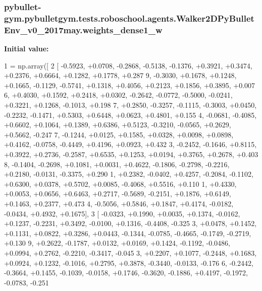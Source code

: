 \subsubsection[{\texorpdfstring{weights\+\_\+dense1\+\_\+w}{weights_dense1_w}}]{\setlength{\rightskip}{0pt plus 5cm}pybullet-\/gym.\+pybulletgym.\+tests.\+roboschool.\+agents.\+Walker2\+D\+Py\+Bullet\+Env\+\_\+v0\+\_\+2017may.\+weights\+\_\+dense1\+\_\+w}\hypertarget{namespacepybullet-gym_1_1pybulletgym_1_1tests_1_1roboschool_1_1agents_1_1_walker2_d_py_bullet_env__v0__2017may_a1ea4f2a96239d2b99fbcdc5fc68877ac}{}\label{namespacepybullet-gym_1_1pybulletgym_1_1tests_1_1roboschool_1_1agents_1_1_walker2_d_py_bullet_env__v0__2017may_a1ea4f2a96239d2b99fbcdc5fc68877ac}
{\bfseries Initial value\+:}
\begin{DoxyCode}
1 = np.array([
2 [ -0.5923, +0.0708, -0.2868, -0.5138, -0.1376, +0.3921, +0.3474, +0.2376, +0.6664, +0.1282, +0.1778, +0.287
      9, -0.3030, +0.1678, +0.1248, +0.1665, -0.1129, -0.5741, +0.1318, +0.4056, +0.2123, +0.1856, +0.3895, +0.007
      6, +0.4030, +0.1592, +0.2418, +0.0302, -0.2642, -0.0772, -0.5000, -0.0241, +0.3221, +0.1268, -0.1013, +0.198
      7, +0.2850, -0.3257, -0.1115, -0.3003, +0.0450, -0.2232, -0.1471, +0.5303, +0.6448, +0.0623, +0.4801, +0.155
      4, -0.0681, -0.4085, +0.6602, +0.1064, +0.1389, +0.6386, +0.5123, -0.3210, -0.0565, +0.2629, +0.5662, -0.247
      7, -0.1244, +0.0125, +0.1585, +0.0328, +0.0098, +0.0898, +0.4162, -0.0758, -0.4449, +0.4196, +0.0923, +0.432
      3, -0.2452, -0.1646, +0.8115, +0.3922, +0.2736, -0.2587, +0.6535, +0.1253, +0.0194, +0.3765, +0.2678, +0.403
      8, -0.1404, -0.2698, +0.1081, +0.0031, +0.4622, -0.1806, -0.2798, -0.2216, +0.2180, -0.0131, -0.3375, +0.290
      1, +0.2382, -0.0402, +0.4257, -0.2084, -0.1102, +0.6300, +0.0378, +0.5702, +0.0085, -0.4068, +0.5516, +0.110
      1, +0.4330, +0.0053, +0.0656, +0.6463, +0.2717, -0.5689, -0.2151, +0.1876, +0.6149, +0.1463, +0.2377, +0.473
      4, -0.5056, +0.5846, +0.1847, +0.4174, -0.0182, -0.0434, +0.4932, +0.1675],
3 [ -0.0323, +0.1990, +0.0035, +0.1374, -0.0162, +0.1237, -0.2231, +0.3492, -0.0100, +0.1316, -0.4408, -0.325
      3, +0.0478, +0.1452, +0.1131, +0.0822, +0.3286, +0.0443, -0.1344, -0.0785, -0.4665, -0.1749, -0.2719, +0.130
      9, +0.2622, -0.1787, +0.0132, +0.0169, +0.1424, -0.1192, -0.0486, +0.0994, +0.2762, -0.2210, -0.3417, -0.045
      3, +0.2207, +0.1077, -0.2448, +0.1683, +0.0924, +0.1232, -0.1016, +0.2795, +0.3878, -0.3440, -0.0133, -0.176
      6, -0.2442, -0.3664, +0.1455, -0.1039, -0.0158, +0.1746, -0.3620, -0.1886, +0.4197, -0.1972, -0.0783, -0.251

\end{DoxyCode}
